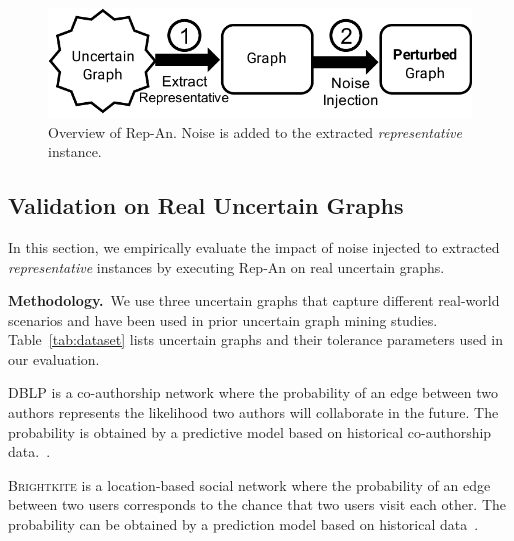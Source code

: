 
\begin{figure}[t]
	\vspace{-1em}
    \captionsetup{margin=0cm}
    \centering  
        \includegraphics[width=0.95\columnwidth]{AddFigure/repOB.pdf}
        \vspace{-0.7em}
    	\caption{Overview of Rep-An. Noise is added to the extracted \emph{representative} instance.}
    \label{fig:repOB}
    \vspace{-0.5em}
\end{figure}
\subsection{Validation on Real Uncertain Graphs}
In this section, we empirically evaluate the impact of noise injected to extracted \emph{representative} instances by executing Rep-An on real uncertain graphs.

\textbf{Methodology.}~We use three uncertain graphs that capture different real-world scenarios and have been used in prior uncertain graph mining studies. Table~\ref{tab:dataset} lists uncertain graphs and their tolerance parameters used in our evaluation.

\textsc{DBLP} is a co-authorship network where the probability of an edge between two authors represents the likelihood two authors will collaborate in the future. The probability is obtained by a predictive model based on historical co-authorship data.~\cite{Jin_Distance_2011}. 

\textsc{Brightkite} is a location-based social network where the probability of an edge between two users corresponds to the chance that two users visit each other. The probability can be obtained by a prediction model based on historical data~\cite{Cho_Friendship_2011}.

